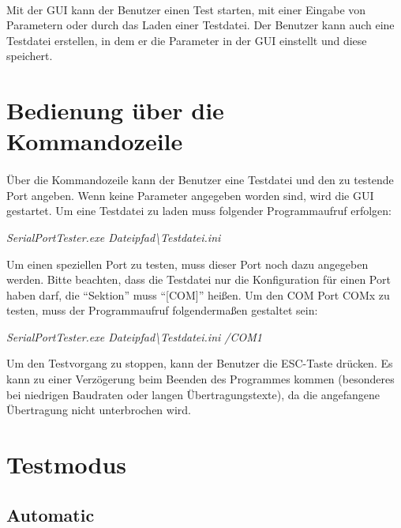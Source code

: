 \paragraph{}
Mit der GUI kann der Benutzer einen Test starten, mit einer Eingabe von Parametern oder durch das Laden einer Testdatei. Der Benutzer kann auch eine Testdatei erstellen, in dem er die Parameter in der GUI einstellt und diese speichert.

\section{Bedienung über die Kommandozeile}
\paragraph{}
Über die Kommandozeile kann der Benutzer eine Testdatei und den zu testende Port angeben. Wenn keine Parameter angegeben worden sind, wird die GUI gestartet. Um eine Testdatei zu laden muss folgender Programmaufruf erfolgen:
\begin{center}
\textit{SerialPortTester.exe Dateipfad\textbackslash Testdatei.ini}
\end{center}

Um einen speziellen Port zu testen, muss dieser Port noch dazu angegeben werden. Bitte beachten, dass die Testdatei nur die Konfiguration für einen Port haben darf, die "`Sektion"' muss "`[COM]"' heißen. Um den COM Port COMx zu testen, muss der Programmaufruf folgendermaßen gestaltet sein:

\begin{center}
\textit{SerialPortTester.exe Dateipfad\textbackslash Testdatei.ini /COM1}
\end{center}

Um den Testvorgang zu stoppen, kann der Benutzer die ESC-Taste drücken. Es kann zu einer Verzögerung beim Beenden des Programmes kommen (besonderes bei niedrigen Baudraten oder langen Übertragungstexte), da die angefangene Übertragung nicht unterbrochen wird.


\section{Testmodus}

\subsection{Automatic}
